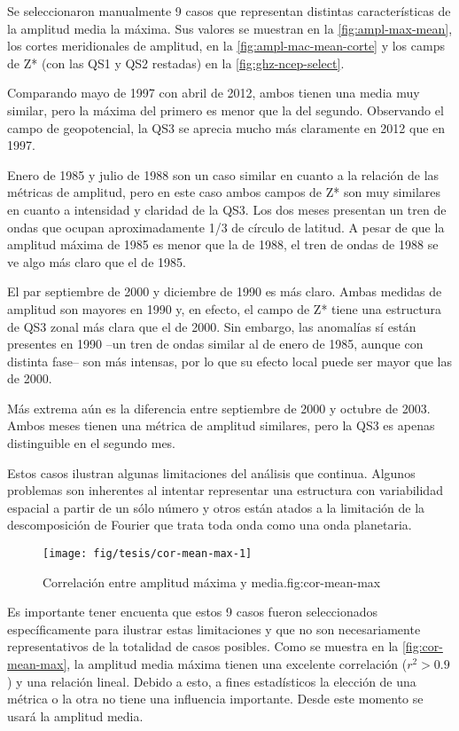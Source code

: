 \documentclass[spanish,a4paper]{book}
\begin{document}
Se seleccionaron manualmente 9 casos que representan distintas
características de la amplitud media la máxima. Sus valores se muestran
en la \autoref{fig:ampl-max-mean}, los cortes meridionales de amplitud,
en la \autoref{fig:ampl-mac-mean-corte} y los camps de Z* (con las QS1 y
QS2 restadas) en la \autoref{fig:ghz-ncep-select}.

Comparando mayo de 1997 con abril de 2012, ambos tienen una media muy
similar, pero la máxima del primero es menor que la del segundo.
Observando el campo de geopotencial, la QS3 se aprecia mucho más
claramente en 2012 que en 1997.

Enero de 1985 y julio de 1988 son un caso similar en cuanto a la
relación de las métricas de amplitud, pero en este
caso ambos campos de Z* son muy similares en cuanto
a intensidad y claridad de la QS3. Los dos meses presentan un tren de
ondas que ocupan aproximadamente 1/3 de círculo de latitud. A pesar de
que la amplitud máxima de 1985 es menor que la de 1988, el tren de ondas
de 1988 se ve algo más claro que el de 1985.

El par septiembre de 2000 y diciembre de 1990 es más claro. Ambas
medidas de amplitud son mayores en 1990 y, en efecto, el campo de Z*
tiene una estructura de QS3 zonal más clara que el de 2000. Sin embargo,
las anomalías sí están presentes en 1990 --un tren de ondas similar al
de enero de 1985, aunque con distinta fase-- son más intensas, por lo
que su efecto local puede ser mayor que las de 2000.

Más extrema aún es la diferencia entre septiembre de 2000 y octubre de
2003. Ambos meses tienen una métrica de amplitud similares, pero la QS3
es apenas distinguible en el segundo mes.

Estos casos ilustran algunas limitaciones del análisis que continua.
Algunos problemas son inherentes al intentar representar una estructura
con variabilidad espacial a partir de un sólo número y otros están
atados a la limitación de la descomposición de Fourier que trata toda
onda como una onda
planetaria.

\begin{figure}
\texttt{[image: fig/tesis/cor-mean-max-1]} \caption{Correlación entre amplitud máxima y media.{fig:cor-mean-max}}\label{fig:cor-mean-max}
\end{figure}

Es importante tener encuenta que estos 9 casos fueron seleccionados
específicamente para ilustrar estas limitaciones y que no son
necesariamente representativos de la totalidad de casos posibles. Como
se muestra en la \autoref{fig:cor-mean-max}, la amplitud media máxima
tienen una excelente correlación (\(r^2>0.9\)) y una relación lineal.
Debido a esto, a fines estadísticos la elección de una métrica o la otra
no tiene una influencia importante. Desde este momento se usará la
amplitud media.
\end{document}
